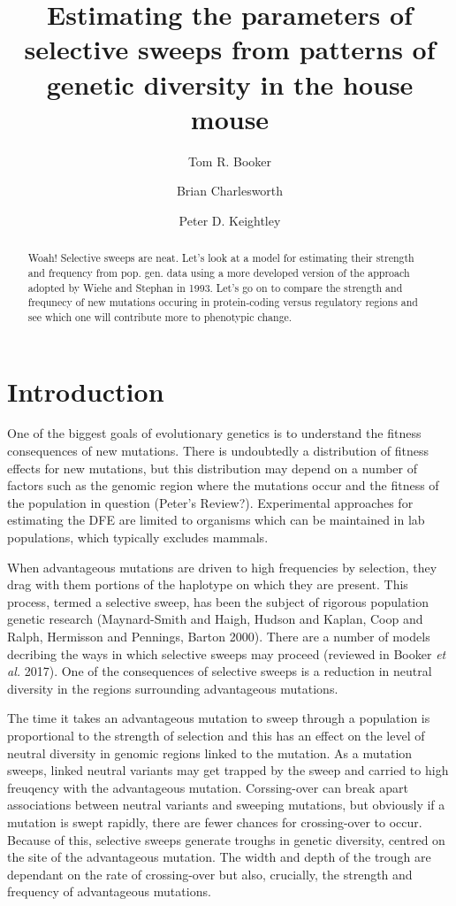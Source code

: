 \documentclass{article}
\title{\textbf{Estimating the parameters of selective sweeps from patterns of genetic diversity in the house mouse}}
\author[1,*]{Tom R. Booker}
\author[1]{Brian Charlesworth}
\author[1]{Peter D. Keightley}
\affil[1]{Institute of Evolutionary Biology, University of Edinburgh, Edinburgh}
\affil[*]{\emph{t.r.booker@sms.ed.ac.uk}}
\begin{document}
\maketitle
\begin{abstract}
Woah! Selective sweeps are neat. Let's look at a model for estimating their strength and frequency from pop. gen. data using a more developed version of the approach adopted by Wiehe and Stephan in 1993. Let's go on to compare the strength and frequnecy of new mutations occuring in protein-coding versus regulatory regions and see which one will contribute more to phenotypic change.

\end{abstract}

\section*{Introduction}

One of the biggest goals of evolutionary genetics is to understand the fitness consequences of new mutations. There is undoubtedly a distribution of fitness effects for new mutations, but this distribution may depend on a number of factors such as the genomic region where the mutations occur and the fitness of the population in question (Peter's Review?). Experimental approaches for estimating the DFE are limited to organisms which can be maintained in lab populations, which typically excludes mammals. 

When advantageous mutations are driven to high frequencies by selection, they drag with them portions of the haplotype on which they are present. This process, termed a selective sweep, has been the subject of rigorous population genetic research (Maynard-Smith and Haigh, Hudson and Kaplan, Coop and Ralph, Hermisson and Pennings, Barton 2000). There are a number of models decribing the ways in which selective sweeps may proceed (reviewed in Booker \textit{et al.} 2017). One of the consequences of selective sweeps is a reduction in neutral diversity in the regions surrounding advantageous mutations. 

The time it takes an advantageous mutation to sweep through a population is proportional to the strength of selection and this has an effect on the level of neutral diversity in genomic regions linked to the mutation. As a mutation sweeps, linked neutral variants may get trapped by the sweep and carried to high freuqency with the advantageous mutation. Corssing-over can break apart associations between neutral variants and sweeping mutations, but obviously if a mutation is swept rapidly, there are fewer chances for crossing-over to occur. Because of this, selective sweeps generate troughs in genetic diversity, centred on the site of the advantageous mutation. The width and depth of the trough are dependant on the rate of crossing-over but also, crucially, the strength and frequency of advantageous mutations.
\end{document}
